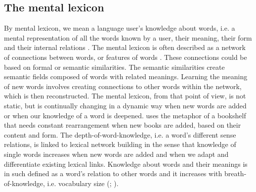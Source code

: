 \documentclass[output=paper,colorlinks,citecolor=brown,nonflat]{langsci/langscibook}
\begin{document}
\subsection{The mental lexicon}\label{sec:gudmundson:1.1}

By mental lexicon, we mean a language user’s knowledge about words, i.e. a mental representation of all the words known by a user, their meaning, their form and their internal relations \citep{Aitchison2012}. The mental lexicon is often described as a network of connections between words, or features of words \citep{Aitchison2012}. These connections could be based on formal or semantic similarities. The semantic similarities create semantic fields composed of words with related meanings. Learning the meaning of new words involves creating connections to other words within the network, which is then reconstructed. The mental lexicon, from that point of view, is not static, but is continually changing in a dynamic way when new words are added or when our knowledge of a word is deepened. \citet[209--210]{Aitchison2012} uses the metaphor of a bookshelf that needs constant rearrangement when new books are added, based on their content and form. The depth-of-word-knowledge, i.e. a word’s different sense relations, is linked to lexical network building in the sense that knowledge of single words increases when new words are added and when we adapt and differentiate existing lexical links. Knowledge about words and their meanings is in such defined as a word’s relation to other words and it increases with breath-of-knowledge, i.e. vocabulary size (\citealt[222]{HaastrupHenriksen2000}; \citealt{Nation2001, Read2004}).
\end{document}
